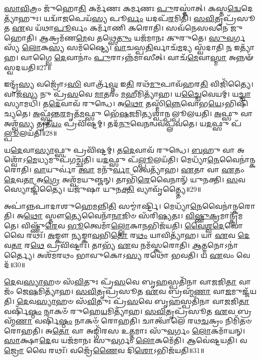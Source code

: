 \-\ul{𑌸𑌾}\-\-\ul{𑌵𑌿}\-𑌤𑍍𑌰𑌂 𑌜𑍁᳴𑌹𑍋\-\ul{𑌤𑌿} 𑌕𑌰𑍍𑌮᳴𑌣𑌃 𑌕𑌰𑍍𑌮𑌣𑌃 \ul{𑌪𑍁}\-𑌰𑌸𑍍𑌤𑌾॑𑌤𑍍।
𑌕𑌸𑍍𑌤\-\ul{𑌦𑍍𑌵𑍇}\-𑌦𑍇𑌤𑍍𑌯𑌾᳴𑌹𑍁𑌃।
𑌯𑌦𑍍𑌵𑌾᳴\-\ul{𑌜}\-𑌪𑍇𑌯᳴\-\ul{𑌸𑍍𑌯} 𑌪𑍂\-\ul{𑌰𑍍𑌵𑌂} 𑌯𑌦𑌪᳴\-\ul{𑌰}\-𑌮𑌿𑌤𑌿᳴।
\-\ul{𑌸}\-\-\ul{𑌵𑌿}\-𑌤𑍃𑌪𑍍𑌰᳴𑌸𑍂𑌤 \ul{𑌏}\-𑌵 𑌯᳴𑌥𑌾\-\ul{𑌪𑍂}\-𑌰𑍍𑌵𑌂 𑌕𑌰𑍍𑌮𑌾᳴𑌣𑌿 𑌕𑌰𑍋𑌤𑌿।
𑌸𑌵᳴𑌨𑍇𑌸𑌵𑌨𑍇 𑌜𑍁𑌹𑍋𑌤𑌿।
\-\ul{𑌆}\-𑌕𑍍𑌰𑌮᳴𑌣\-\ul{𑌮𑍇}\-𑌵 𑌤𑌥𑍍𑌸𑍇\-\ul{𑌤𑍁𑌂} 𑌯𑌜᳴𑌮𑌾𑌨𑌃 𑌕𑍁𑌰𑍁𑌤𑍇।
\-\ul{𑌸𑍁}\-\-\ul{𑌵}\-𑌰𑍍𑌗𑌸𑍍𑌯᳴ \ul{𑌲𑍋}\-𑌕\-\ul{𑌸𑍍𑌯} 𑌸𑌮᳴𑌷𑍍𑌟𑍍𑌯𑍈।
\-\ul{𑌵𑌾}\-𑌚𑌸𑍍𑌪\-\ul{𑌤𑌿}\-𑌰𑍍𑌵𑌾𑌚᳴\-\ul{𑌮}\-𑌦𑍍𑌯 𑌸𑍍𑌵᳴𑌦𑌾𑌤𑌿 \ul{𑌨} 𑌇𑌤𑍍𑌯𑌾᳴𑌹।
𑌵𑌾𑌗𑍍𑌵𑍈 \ul{𑌦𑍇}\-𑌵𑌾𑌨𑌾𑌂॑ \ul{𑌪𑍁}\-𑌰𑌾\-𑌽𑌨𑍍𑌨᳴𑌮𑌾𑌸𑍀𑌤𑍍।
𑌵𑌾𑌚᳴\-\ul{𑌮𑍇}\-𑌵𑌾\-\ul{𑌸𑍍𑌮𑌾} 𑌅𑌨𑍍𑌨𑍟᳴ 𑌸𑍍𑌵𑌦𑌯𑌤𑌿॥27॥

𑌇𑌨𑍍𑌦𑍍𑌰᳴\-\ul{𑌸𑍍𑌯} 𑌵𑌜𑍍𑌰𑍋᳴𑌽\-\ul{𑌸𑌿} 𑌵𑌾𑌰𑍍𑌤𑍍𑌰᳴\-\ul{𑌘𑍍𑌨} 𑌇\-\ul{𑌤𑌿} 𑌰𑌥᳴\-\ul{𑌮𑍁}\-𑌪𑌾𑌵᳴𑌹𑌰\-\ul{𑌤𑌿} 𑌵𑌿𑌜𑌿᳴𑌤𑍍𑌯𑍈।
𑌵𑌾𑌜᳴\-\ul{𑌸𑍍𑌯} 𑌨𑍁 𑌪𑍍𑌰᳴\-\ul{𑌸}\-𑌵𑍇 \ul{𑌮𑌾}\-𑌤𑌰𑌂᳴ \ul{𑌮}\-𑌹𑍀𑌮𑌿𑌤𑍍𑌯𑌾᳴𑌹।
𑌯\-\ul{𑌚𑍍𑌚𑍈}\-𑌵𑍇𑌯𑌮𑍍।
𑌯\-\ul{𑌚𑍍𑌚𑌾}\-𑌸𑍍𑌯𑌾𑌮𑌧𑌿᳴।
𑌤\-\ul{𑌦𑍇}\-𑌵𑌾𑌵᳴ 𑌰𑍁𑌨𑍍𑌧𑍇।
𑌅\-\ul{𑌥𑍋} 𑌤𑌸𑍍𑌮𑌿᳴\-\ul{𑌨𑍍𑌨𑍇}\-𑌵𑍋𑌭\-\ul{𑌯𑍇}\-\-𑌽𑌭𑌿\-𑌷𑌿᳴𑌚𑍍𑌯𑌤𑍇।
\-\ul{𑌅}\-𑌫𑍍𑌸𑍍𑌵᳴𑌨𑍍𑌤\-\ul{𑌰}\-𑌮𑍃𑌤᳴\-\-\ul{𑌮}\-𑌫𑍍𑌸𑍁 𑌭𑍇᳴\-\ul{𑌷}\-𑌜𑌮𑌿𑌤𑍍𑌯𑌶𑍍𑌵𑌾॑𑌨𑍍𑌪𑌲𑍍𑌪𑍂𑌲𑌯𑌤𑌿।
\-\ul{𑌅}\-𑌫𑍍𑌸𑍁 𑌵𑌾 𑌅𑌶𑍍𑌵᳴\-\ul{𑌸𑍍𑌯} 𑌤𑍃𑌤𑍀᳴\-\ul{𑌯𑌂} 𑌪𑍍𑌰𑌵𑌿᳴𑌷𑍍𑌟𑌮𑍍।
𑌤𑌦᳴\-\ul{𑌨𑍁}\-𑌵𑍇\-\ul{𑌨}\-𑌨𑍍𑌵𑌵᳴𑌪𑍍𑌲𑌵𑌤𑍇।
𑌯\-\ul{𑌦}\-𑌫𑍍𑌸𑍁 𑌪᳴\-\ul{𑌲𑍍𑌪𑍂}\-𑌲𑌯᳴𑌤𑌿॥28॥

𑌯\-\ul{𑌦𑍇}\-𑌵𑌾\-\ul{𑌸𑍍𑌯𑌾}\-𑌫𑍍𑌸𑍁 𑌪𑍍𑌰𑌵𑌿᳴𑌷𑍍𑌟𑌮𑍍।
𑌤\-\ul{𑌦𑍇}\-𑌵𑌾𑌵᳴ 𑌰𑍁𑌨𑍍𑌧𑍇।
\-\ul{𑌬}\-𑌹𑍁 𑌵𑌾 𑌅𑌶𑍍𑌵𑍋᳴\-𑌽\-\ul{𑌮𑍇}\-𑌧𑍍𑌯𑌮𑍁𑌪᳴\-𑌗𑌚𑍍𑌛𑌤𑌿।
𑌯\-\ul{𑌦}\-𑌫𑍍𑌸𑍁 𑌪᳴\-\ul{𑌲𑍍𑌪𑍂}\-𑌲𑌯᳴𑌤𑌿।
𑌮𑍇𑌧𑍍𑌯𑌾᳴\-\ul{𑌨𑍇}\-𑌵𑍈\-𑌨𑌾॑𑌨𑍍𑌕𑌰𑍋𑌤𑌿।
\-\ul{𑌵𑌾}\-𑌯𑍁𑌰𑍍𑌵𑌾॑ \ul{𑌤𑍍𑌵𑌾} 𑌮𑌨𑍁᳴\-\ul{𑌰𑍍𑌵𑌾} 𑌤𑍍𑌵𑍇𑌤𑍍𑌯𑌾᳴𑌹।
\-\ul{𑌏}\-𑌤𑌾 𑌵𑌾 \ul{𑌏}\-𑌤𑌂 \ul{𑌦𑍇}\-𑌵\-\ul{𑌤𑌾} 𑌅\-\ul{𑌗𑍍𑌰𑍇} 𑌅𑌶𑍍𑌵᳴𑌮𑌯𑍁𑌞𑍍𑌜𑌨𑍍।
𑌤𑌾𑌭𑌿᳴\-\ul{𑌰𑍇}\-𑌵𑍈𑌨𑌾𑌨𑍍᳴ 𑌯𑍁𑌨𑌕𑍍𑌤𑌿।
\-\ul{𑌸}\-𑌵𑌸𑍍𑌯𑍋𑌜𑍍𑌜𑌿᳴𑌤𑍍𑌯𑍈।
𑌯𑌜𑍁᳴𑌷𑌾 𑌯𑍁𑌨\-\ul{𑌕𑍍𑌤𑌿} 𑌵𑍍𑌯𑌾𑌵𑍃᳴𑌤𑍍𑌤𑍍𑌯𑍈॥29॥

𑌅𑌪𑌾॑𑌨𑍍𑌨𑌪𑌾𑌦𑌾𑌶𑍁𑌹𑍇\-\ul{𑌮}\-𑌨𑍍𑌨𑌿\-\ul{𑌤𑌿} 𑌸𑌮𑍍𑌮𑌾॑𑌰𑍍𑌷𑍍𑌟𑌿।
𑌮𑍇𑌧𑍍𑌯𑌾᳴\-\ul{𑌨𑍇}\-𑌵𑍈𑌨𑌾॑𑌨𑍍𑌕𑌰𑍋𑌤𑌿।
𑌅\-\ul{𑌥𑍋} 𑌸𑍍𑌤𑍗\-\ul{𑌤𑍍𑌯𑍇}\-𑌵𑍈𑌨𑌾᳴\-\ul{𑌨𑌾}\-𑌜𑌿𑍞 𑌸᳴𑌰𑌿\-\ul{𑌷𑍍𑌯}\-𑌤𑌃।
\-\ul{𑌵𑌿}\-\-\ul{𑌷𑍍𑌣𑍁}\-\-\ul{𑌕𑍍𑌰}\-𑌮𑌾𑌨𑍍𑌕𑍍𑌰᳴𑌮𑌤𑍇।
𑌵𑌿𑌷𑍍𑌣𑍁᳴\-\ul{𑌰𑍇}\-𑌵 \ul{𑌭𑍂}\-𑌤𑍍𑌵𑍇𑌮𑌾𑌁\-\ul{𑌲𑍍𑌲𑍋}\-𑌕𑌾\-\ul{𑌨}\-𑌭𑌿𑌜᳴𑌯𑌤𑌿।
\-\ul{𑌵𑍈}\-\-\ul{𑌶𑍍𑌵}\-\-\ul{𑌦𑍇}\-𑌵𑍋 𑌵𑍈 𑌰𑌥𑌃᳴।
\-\ul{𑌅}\-𑌙𑍍𑌕𑍗 \ul{𑌨𑍍𑌯}\-𑌙𑍍𑌕𑌾\-\ul{𑌵}\-𑌭𑌿\-\ul{𑌤𑍋} 𑌰\-\ul{𑌥𑌂} 𑌯𑌾𑌵𑌿𑌤𑍍𑌯𑌾᳴𑌹।
𑌯𑌾 \ul{𑌏}\-𑌵 \ul{𑌦𑍇}\-𑌵\-\ul{𑌤𑌾} 𑌰\-\ul{𑌥𑍇} 𑌪𑍍𑌰𑌵𑌿᳴𑌷𑍍𑌟𑌾𑌃।
𑌤𑌾𑌭𑍍𑌯᳴ \ul{𑌏}\-𑌵 𑌨𑌮᳴𑌸𑍍𑌕𑌰𑍋𑌤𑌿।
\-\ul{𑌆}\-𑌤𑍍𑌮𑌨𑍋\-𑌽𑌨𑌾॑𑌰𑍍𑌤𑍍𑌯𑍈।
𑌅𑌶᳴𑌮𑌰𑌥𑌂 𑌭𑌾𑌵𑍁𑌕𑍋\-𑌽\-\ul{𑌸𑍍𑌯} 𑌰𑌥𑍋᳴ 𑌭𑌵𑌤𑌿।
𑌯 \ul{𑌏}\-𑌵𑌂 𑌵𑍇𑌦᳴॥30॥\anuvakamend[\-\ul{𑌸𑍍𑌵}\-\-\ul{𑌦}\-\-\ul{𑌯}\-\-\ul{𑌤𑌿} \ul{𑌪}\-\-\ul{𑌲𑍍𑌪𑍂}\-𑌲𑌯᳴\-\ul{𑌤𑌿} 𑌵𑍍𑌯𑌾𑌵𑍃᳴\-\ul{𑌤𑍍𑌤𑍍𑌯𑌾} 𑌅𑌨𑌾॑\-\ul{𑌰𑍍𑌤𑍍𑌯𑍈} 𑌦𑍍𑌵𑍇 𑌚᳴]

\-\ul{𑌦𑍇}\-𑌵\-\ul{𑌸𑍍𑌯𑌾}\-𑌹𑍞 𑌸᳴\-\ul{𑌵𑌿}\-𑌤𑍁𑌃 𑌪𑍍𑌰᳴\-\ul{𑌸}\-𑌵𑍇 𑌬𑍃\-\ul{𑌹}\-𑌸𑍍𑌪𑌤𑌿᳴𑌨𑌾 𑌵𑌾\-\ul{𑌜}\-𑌜𑌿\-\ul{𑌤𑌾} 𑌵𑌾𑌜𑌂᳴ 𑌜𑍇\-\ul{𑌷}\-𑌮𑌿𑌤𑍍𑌯𑌾᳴𑌹।
\-\ul{𑌸}\-\-\ul{𑌵𑌿}\-𑌤𑍃𑌪𑍍𑌰᳴𑌸𑍂𑌤 \ul{𑌏}\-𑌵 𑌬𑍍𑌰𑌹𑍍𑌮᳴\-\ul{𑌣𑌾} 𑌵𑌾\-\ul{𑌜}\-𑌮𑍁𑌜𑍍𑌜᳴𑌯𑌤𑌿।
\-\ul{𑌦𑍇}\-𑌵\-\ul{𑌸𑍍𑌯𑌾}\-𑌹𑍞 𑌸᳴\-\ul{𑌵𑌿}\-𑌤𑍁𑌃 𑌪𑍍𑌰᳴\-\ul{𑌸}\-𑌵𑍇 𑌬𑍃\-\ul{𑌹}\-𑌸𑍍𑌪𑌤𑌿᳴𑌨𑌾 𑌵𑌾\-\ul{𑌜}\-𑌜𑌿\-\ul{𑌤𑌾} 𑌵𑌰𑍍\mbox{}𑌷𑌿᳴\-\ul{𑌷𑍍𑌠𑌂} 𑌨𑌾𑌕𑍞᳴ 𑌰𑍁𑌹𑍇\-\ul{𑌯}\-𑌮𑌿𑌤𑍍𑌯𑌾᳴𑌹।
\-\ul{𑌸}\-\-\ul{𑌵𑌿}\-𑌤𑍃𑌪𑍍𑌰᳴𑌸𑍂𑌤 \ul{𑌏}\-𑌵 𑌬𑍍𑌰𑌹𑍍𑌮᳴\-\ul{𑌣𑌾} 𑌵𑌰𑍍\mbox{}𑌷𑌿᳴\-\ul{𑌷𑍍𑌠𑌂} 𑌨𑌾𑌕𑍞᳴ 𑌰𑍋𑌹𑌤𑌿।
𑌚𑌾𑌤𑍍𑌵𑌾᳴𑌲𑍇 𑌰𑌥\-\ul{𑌚}\-𑌕𑍍𑌰𑌂 𑌨𑌿𑌮𑌿᳴𑌤𑍞 𑌰𑍋𑌹𑌤𑌿।
𑌅\-\ul{𑌤𑍋} 𑌵𑌾 𑌅𑌙𑍍𑌗𑌿᳴𑌰𑌸 𑌉\-\ul{𑌤𑍍𑌤}\-𑌮𑌾𑌃 𑌸𑍁᳴\-\ul{𑌵}\-𑌰𑍍𑌗𑌂 \ul{𑌲𑍋}\-𑌕𑌮𑌾᳴𑌯𑌨𑍍।
\-\ul{𑌸𑌾}\-𑌕𑍍𑌷𑌾\-\ul{𑌦𑍇}\-𑌵 𑌯𑌜᳴𑌮𑌾𑌨𑌃 𑌸𑍁\-\ul{𑌵}\-𑌰𑍍𑌗𑌂 \ul{𑌲𑍋}\-𑌕𑌮𑍇᳴𑌤𑌿।
𑌆𑌵𑍇॑𑌷𑍍𑌟𑌯𑌤𑌿।
𑌵\-\ul{𑌜𑍍𑌰𑍋} 𑌵𑍈 𑌰𑌥𑌃᳴।
𑌵𑌜𑍍𑌰𑍇᳴\-\ul{𑌣𑍈}\-𑌵 𑌦𑌿\-\ul{𑌶𑍋}\-\-𑌽𑌭𑌿𑌜᳴𑌯𑌤𑌿॥31॥

